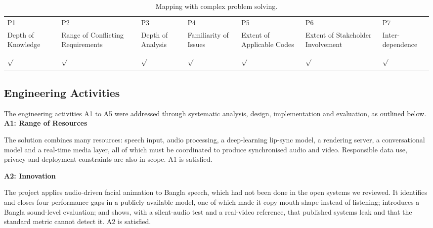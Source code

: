 \begin{center}
    \begin{table}[ht]
        \centering
        \caption{Mapping with complex problem solving.}
        \begin{tabular}{|p{}|p{}|p{}|p{}|p{}|p{}|p{}|}
        \hline
        P1& P2& P3& P4& P5& P6& P7\\
        Depth of Knowledge & Range of Conflicting Requirements & Depth of Analysis & Familiarity of Issues & Extent of Applicable Codes & Extent of Stakeholder Involvement & Inter-dependence\\
        \hline
        $\sqrt{}$ & $\sqrt{}$ & $\sqrt{}$ & $\sqrt{}$ & $\sqrt{}$ & $\sqrt{}$ & $\sqrt{}$\\
        &&&&&&\\
        \hline
        \end{tabular}
        \label{tab:p_solve}
    \end{table}
\end{center}


\subsection{Engineering Activities}

The engineering activities A1 to A5 were addressed through systematic analysis, design, implementation and evaluation, as outlined below.\\

\noindent
\textbf{A1: Range of Resources}

\noindent
The solution combines many resources: speech input, audio processing, a deep-learning lip-sync model, a rendering server, a conversational model and a real-time media layer, all of which must be coordinated to produce synchronised audio and video. Responsible data use, privacy and deployment constraints are also in scope. A1 is satisfied.

\vspace{0.5em}

\noindent
\textbf{A2: Innovation}

\noindent
The project applies audio-driven facial animation to Bangla speech, which had not been done in the open systems we reviewed. It identifies and closes four performance gaps in a publicly available model, one of which made it copy mouth shape instead of listening; introduces a Bangla sound-level evaluation; and shows, with a silent-audio test and a real-video reference, that published systems leak and that the standard metric cannot detect it. A2 is satisfied.


